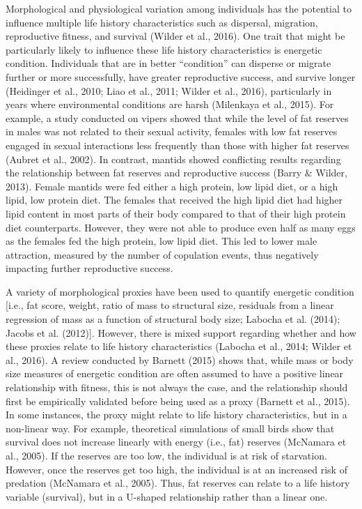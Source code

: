 \documentclass[
]{article}
\begin{document}
Morphological and physiological variation among individuals has the
potential to influence multiple life history characteristics such as
dispersal, migration, reproductive fitness, and survival (Wilder et al.,
2016). One trait that might be particularly likely to influence these
life history characteristics is energetic condition. Individuals that
are in better ``condition'' can disperse or migrate further or more
successfully, have greater reproductive success, and survive longer
(Heidinger et al., 2010; Liao et al., 2011; Wilder et al., 2016),
particularly in years where environmental conditions are harsh
(Milenkaya et al., 2015). For example, a study conducted on vipers
showed that while the level of fat reserves in males was not related to
their sexual activity, females with low fat reserves engaged in sexual
interactions less frequently than those with higher fat reserves (Aubret
et al., 2002). In contrast, mantids showed conflicting results regarding
the relationship between fat reserves and reproductive success (Barry \&
Wilder, 2013). Female mantids were fed either a high protein, low lipid
diet, or a high lipid, low protein diet. The females that received the
high lipid diet had higher lipid content in most parts of their body
compared to that of their high protein diet counterparts. However, they
were not able to produce even half as many eggs as the females fed the
high protein, low lipid diet. This led to lower male attraction,
measured by the number of copulation events, thus negatively impacting
further reproductive success.

A variety of morphological proxies have been used to quantify energetic
condition {[}i.e., fat score, weight, ratio of mass to structural size,
residuals from a linear regression of mass as a function of structural
body size; Labocha et al. (2014); Jacobs et al. (2012){]}. However,
there is mixed support regarding whether and how these proxies relate to
life history characteristics (Labocha et al., 2014; Wilder et al.,
2016). A review conducted by Barnett (2015) shows that, while mass or
body size measures of energetic condition are often assumed to have a
positive linear relationship with fitness, this is not always the case,
and the relationship should first be empirically validated before being
used as a proxy (Barnett et al., 2015). In some instances, the proxy
might relate to life history characteristics, but in a non-linear way.
For example, theoretical simulations of small birds show that survival
does not increase linearly with energy (i.e., fat) reserves (McNamara et
al., 2005). If the reserves are too low, the individual is at risk of
starvation. However, once the reserves get too high, the individual is
at an increased risk of predation (McNamara et al., 2005). Thus, fat
reserves can relate to a life history variable (survival), but in a
U-shaped relationship rather than a linear one.
\end{document}
